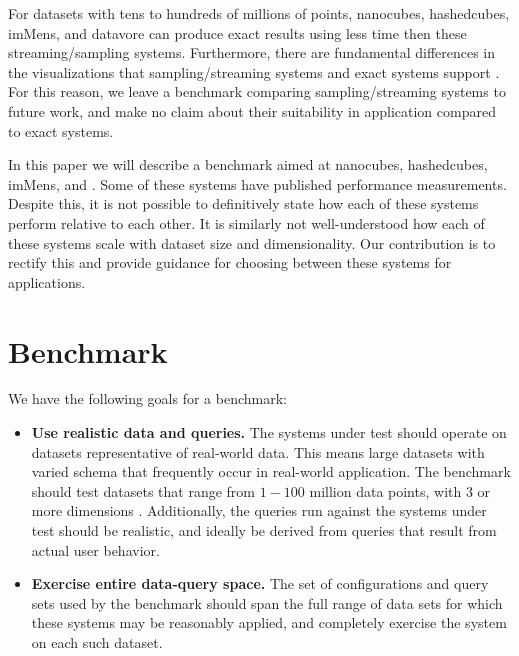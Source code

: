 \documentclass[journal]{vgtc}                %
\begin{document}

For datasets with tens to hundreds of millions of
points, nanocubes, hashedcubes, imMens, and datavore can produce exact  results
using less time then these streaming/sampling systems. Furthermore, there are fundamental differences in the visualizations that sampling/streaming systems and exact systems support \cite{nivan}. For this reason, we leave a benchmark comparing sampling/streaming systems to future work, and make no claim about their suitability in application compared to exact systems. 

In this paper we will describe a benchmark aimed at nanocubes, hashedcubes,
imMens, and . Some of these systems have published performance measurements. Despite this, it is not possible to definitively state how
each of these systems perform relative to each other. It is similarly not
well-understood how each of these systems scale with dataset size
and dimensionality. Our contribution is to rectify this and provide guidance 
for choosing between these systems for applications.


\section{Benchmark}

We have the following goals for a benchmark:

\begin{itemize}
	\item \textbf{Use realistic data and queries.} The systems under test
		should operate on datasets representative of real-world data. This
		means large datasets with varied schema that frequently occur in
		real-world application. The benchmark should test datasets
		that range from $1-100$ million data points, with $3$ or more dimensions
		\cite{...}.  Additionally, the queries run against the systems
		under test should be realistic, and ideally be derived from queries that
		result from actual user behavior.

	\item \textbf{Exercise entire data-query space.} The set of configurations
		and query sets used by the benchmark should span the full range of data
		sets for which these systems may be reasonably applied, and completely exercise the system on each such dataset.
		
\end{itemize}
\end{document}
